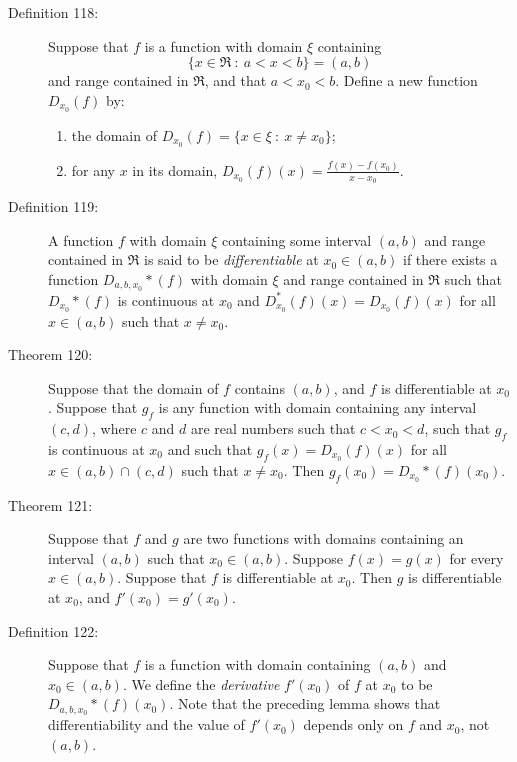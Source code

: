 \documentclass{article}
\begin{document}
\begin{description}
  \item[Definition 118:] Suppose that $f$ is a function with domain $\xi$ containing
    \begin{equation*}
    \{ x \in \Re\ :\ a < x < b \} = (a,b)
    \end{equation*}
    and range contained in $\Re$, and that $a < x_{0} < b$. Define a new function $D_{x_{0}}(f)$ by:
    \begin{enumerate}[\hspace{1cm}1.]
      \item the domain of $D_{x_{0}} (f) = \{ x \in \xi\ :\ x \neq x_{0} \}$;
      \item for any $x$ in its domain, $D_{x_{0}} (f) (x) = \frac{f(x)-f(x_{0})}{x-x_{0}}$.
    \end{enumerate}

  \item[Definition 119:] A function $f$ with domain $\xi$ containing some interval $(a,b)$ and range contained in $\Re$ is said to be \emph{differentiable} at $x_{0} \in (a,b)$ if there exists a function $D_{a,b,x_{0}}* (f)$ with domain $\xi$ and range contained in $\Re$ such that $D_{x_{0}}* (f)$ is continuous at $x_{0}$ and $D_{x_{0}}^{\ast}(f) (x) = D_{x_{0}}(f) (x)$ for all $x \in (a,b)$ such that $x \neq x_{0}$.

  \item[Theorem 120:] Suppose that the domain of $f$ contains $(a,b)$, and $f$ is differentiable at $x_{0}$. Suppose that $g_{f}$ is any function with domain containing any interval $(c,d)$, where $c$ and $d$ are real numbers such that $c < x_{0} < d$, such that $g_{f}$ is continuous at $x_{0}$ and such that $g_{f}(x) = D_{x_{0}}(f) (x)$ for all $x \in (a,b) \cap (c,d)$ such that $x \neq x_{0}$. Then $g_{f} (x_{0}) = D_{x_{0}}* (f) (x_{0})$.

  \item[Theorem 121:] Suppose that $f$ and $g$ are two functions with domains containing an interval $(a,b)$ such that $x_{0} \in (a,b)$. Suppose $f(x) = g(x)$ for every $x \in (a,b)$. Suppose that $f$ is differentiable at $x_{0}$. Then $g$ is differentiable at $x_{0}$, and $f' (x_{0}) = g' (x_{0})$. 

  \item[Definition 122:] Suppose that $f$ is a function with domain containing $(a,b)$ and $x_{0} \in (a,b)$. We define the \emph{derivative} $f' (x_{0})$ of $f$ at $x_{0}$ to be $D_{a,b,x_{0}}* (f) (x_{0})$. Note that the preceding lemma shows that differentiability and the value of $f' (x_{0})$ depends only on $f$ and $x_{0}$, not $(a,b)$.


\end{description}
\end{document}
